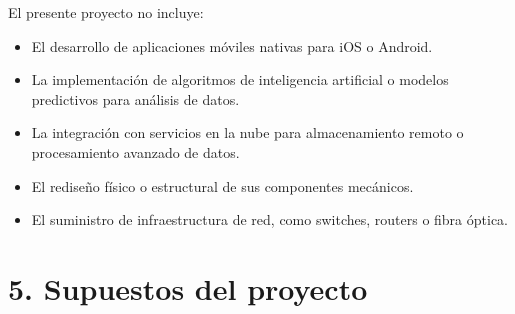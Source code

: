 \documentclass[
11pt, %
]{charter}
\begin{document}
El presente proyecto no incluye:

\begin{itemize}
	\item El desarrollo de aplicaciones móviles nativas para iOS o Android.

	\item La implementación de algoritmos de inteligencia artificial o modelos predictivos para análisis de datos.

	\item La integración con servicios en la nube para almacenamiento remoto o procesamiento avanzado de datos.

	\item El rediseño físico o estructural de sus componentes mecánicos.

	\item El suministro de infraestructura de red, como switches, routers o fibra óptica.
\end{itemize}

\section{5. Supuestos del proyecto}
\label{sec:supuestos}
\end{document}
